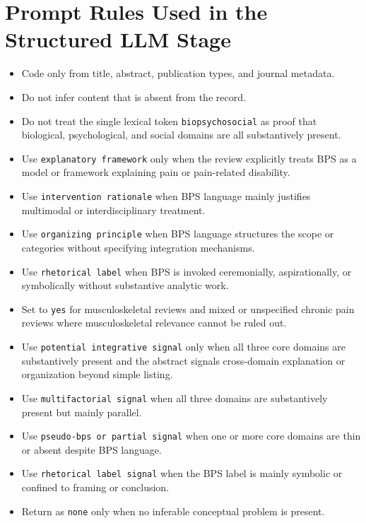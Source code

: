 \documentclass[11pt]{article}
\begin{document}
\section*{Prompt Rules Used in the Structured LLM Stage}
\begin{itemize}
\item Code only from title, abstract, publication types, and journal metadata.
\item Do not infer content that is absent from the record.
\item Do not treat the single lexical token \texttt{biopsychosocial} as proof that biological, psychological, and social domains are all substantively present.
\item Use \texttt{explanatory framework} only when the review explicitly treats BPS as a model or framework explaining pain or pain-related disability.
\item Use \texttt{intervention rationale} when BPS language mainly justifies multimodal or interdisciplinary treatment.
\item Use \texttt{organizing principle} when BPS language structures the scope or categories without specifying integration mechanisms.
\item Use \texttt{rhetorical label} when BPS is invoked ceremonially, aspirationally, or symbolically without substantive analytic work.
\item Set  to \texttt{yes} for musculoskeletal reviews and mixed or unspecified chronic pain reviews where musculoskeletal relevance cannot be ruled out.
\item Use \texttt{potential integrative signal} only when all three core domains are substantively present and the abstract signals cross-domain explanation or organization beyond simple listing.
\item Use \texttt{multifactorial signal} when all three domains are substantively present but mainly parallel.
\item Use \texttt{pseudo-bps or partial signal} when one or more core domains are thin or absent despite BPS language.
\item Use \texttt{rhetorical label signal} when the BPS label is mainly symbolic or confined to framing or conclusion.
\item Return  as \texttt{none} only when no inferable conceptual problem is present.
\end{itemize}
\end{document}
